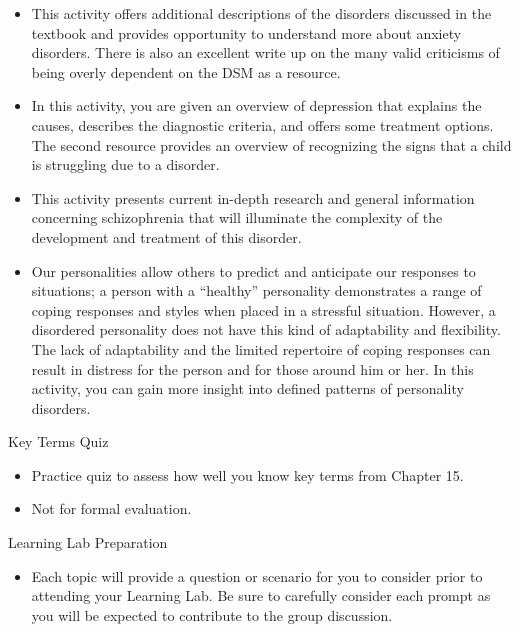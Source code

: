 \documentclass[
]{book}
\providecommand{\tightlist}{%
  \setlength{\itemsep}{0pt}\setlength{\parskip}{0pt}}
\begin{document}
\begin{reflect}
\begin{itemize}
\tightlist
\item
  This activity offers additional descriptions of the disorders discussed in the textbook and provides opportunity to understand more about anxiety disorders. There is also an excellent write up on the many valid criticisms of being overly dependent on the DSM as a resource.\\
\item
  In this activity, you are given an overview of depression that explains the causes, describes the diagnostic criteria, and offers some treatment options. The second resource provides an overview of recognizing the signs that a child is struggling due to a disorder.\\
\item
  This activity presents current in-depth research and general information concerning schizophrenia that will illuminate the complexity of the development and treatment of this disorder.\\
\item
  Our personalities allow others to predict and anticipate our responses to situations; a person with a ``healthy'' personality demonstrates a range of coping responses and styles when placed in a stressful situation. However, a disordered personality does not have this kind of adaptability and flexibility. The lack of adaptability and the limited repertoire of coping responses can result in distress for the person and for those around him or her. In this activity, you can gain more insight into defined patterns of personality disorders.
\end{itemize}

{Key Terms Quiz}

\begin{itemize}
\tightlist
\item
  Practice quiz to assess how well you know key terms from Chapter 15.\\
\item
  Not for formal evaluation.
\end{itemize}

{Learning Lab Preparation}

\begin{itemize}
\tightlist
\item
  Each topic will provide a question or scenario for you to consider prior to attending your Learning Lab. Be sure to carefully consider each prompt as you will be expected to contribute to the group discussion.
\end{itemize}
\end{reflect}
\end{document}
